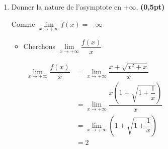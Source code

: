 \documentclass[12pt,a4paper]{article}
\begin{document}
\begin{enumerate}
\begin{enumerate}
\begin{itemize}

        \end{itemize}
        
        \item Donner la nature de l'asymptote en $+\infty$. \textbf{(0,5pt)}

Comme $\lim\limits_{x \to +\infty} f(x) = -\infty$ 

\begin{itemize}
\item Cherchons  $\lim\limits_{x \to +\infty} \dfrac{f(x)}{x} $  

\(
\begin{aligned}
 \lim\limits_{x \to +\infty} \dfrac{f(x)}{x} &= \lim\limits_{x \to +\infty}  \dfrac{x + \sqrt{x^2+x}}{x}\\
 																	&= \lim\limits_{x \to +\infty} \dfrac{x\left(1 + \sqrt{1+\dfrac{1}{x}}\right)}{x}\\
 																	&= \lim\limits_{x \to +\infty} \left(1 + \sqrt{1+\dfrac{1}{x}}\right)\\
 																	&= 2
\end{aligned}    
\)        


\end{itemize}
\end{enumerate}
\end{enumerate}
\end{document}
